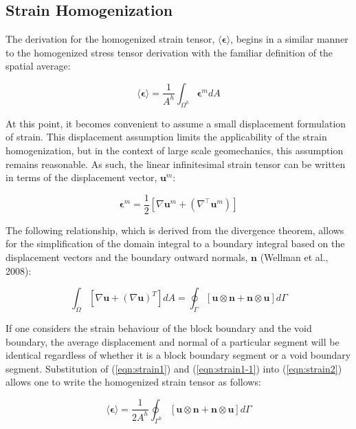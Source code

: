 \subsection{Strain Homogenization}

The derivation for the homogenized strain tensor, $\langle\boldsymbol{\epsilon}\rangle$, begins in a similar manner to the homogenized stress tensor derivation with the familiar definition of the spatial average:

\begin{equation}
\langle\boldsymbol{\epsilon}\rangle=\frac{1}{A^{h}}\int_{\Omega^{h}}\boldsymbol{\epsilon}^m dA\label{eqn:strain2}
\end{equation}

At this point, it becomes convenient to assume a small displacement formulation of strain. This displacement assumption limits the applicability of the strain homogenization, but in the context of large scale geomechanics, this assumption remains reasonable. As such, the linear infinitesimal strain tensor can be written in terms of the displacement vector, $\mathbf{u}^m$:

\begin{equation}
\boldsymbol{\epsilon}^m=\frac{1}{2}\left[\nabla\mathbf{u}^m+\left(\nabla^\top \mathbf{u}^m\right)\right]\label{eqn:strain1}
\end{equation}

The following relationship, which is derived from the divergence theorem, allows for the simplification of the domain integral to a boundary
integral based on the displacement vectors and the boundary outward normals, $\mathbf{n}$ (Wellman et al., 2008):

\begin{equation}
\int_{\Omega}\left[\nabla\mathbf{u}+\left(\nabla\mathbf{u}\right)^{T}\right]dA=\oint_{\Gamma}\left[\mathbf{u}\otimes\mathbf{n}+\mathbf{n}\otimes\mathbf{u}\right]d\Gamma\label{eqn:strain1-1}
\end{equation}

If one considers the strain behaviour of the block boundary and the void boundary, the average displacement and normal of a particular segment
will be identical regardless of whether it is a block boundary segment or a void boundary segment. Substitution of (\ref{eqn:strain1}) and (\ref{eqn:strain1-1}) into (\ref{eqn:strain2}) allows one to write the homogenized strain tensor as follows:

\begin{equation}
\langle\boldsymbol{\epsilon}\rangle=\frac{1}{2A^{h}}\oint_{\Gamma^{h}}\left[\mathbf{u}\otimes\mathbf{n}+\mathbf{n}\otimes\mathbf{u}\right]d\Gamma\label{eqn:strain5-1}
\end{equation}


